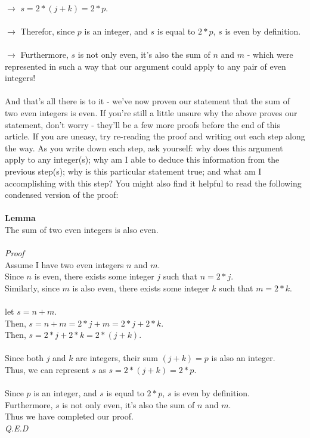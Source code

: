 \documentclass[a4paper,12pt]{article}
\begin{document}
\\
$\rightarrow$ $s = 2*(j + k) = 2*p$.\\ 
\\
$\rightarrow$ Therefor, since $p$ is an integer, and $s$ is equal to $2*p$, $s$ is even by definition.\\ 
\\
$\rightarrow$ Furthermore, $s$ is not only even, it's also the sum of $n$ and $m$ - which were represented in such a way that our argument could apply to any pair of even integers! \\
\\
And that's all there is to it - we've now proven our statement that the sum of two even integers is even. If you're still a little unsure why the above proves our statement, don't worry - they'll be a few more proofs before the end of this article. If you are uneasy, try re-reading the proof and writing out each step along the way. As you write down each step, ask yourself: why does this argument apply to any integer(s); why am I able to deduce this information from the previous step(s); why is this particular statement true; and what am I accomplishing with this step? You might also find it helpful to read the following condensed version of the proof:\\
\\
\textbf{Lemma}\\
The sum of two even integers is also even.\\
\\
\textit{Proof}\\
Assume I have two even integers $n$ and $m$. \\
Since $n$ is even, there exists some integer $j$ such that $n = 2*j$. \\
Similarly, since $m$ is also even, there exists some integer $k$ such that $m = 2*k$. \\
\\
let $s = n + m$.\\
Then, $s = n + m = 2*j + m = 2*j + 2*k$.\\
Then, $s = 2*j + 2*k = 2*(j + k)$. \\
\\
Since both $j$ and $k$ are integers, their sum $(j + k) = p$ is also an integer.\\
Thus, we can represent $s$ as $s = 2*(j + k) = 2*p$.\\ 
\\
Since $p$ is an integer, and $s$ is equal to $2*p$, $s$ is even by definition.\\ 
Furthermore, $s$ is not only even, it's also the sum of $n$ and $m$.\\
Thus we have completed our proof.\\
\textit{Q.E.D}
\end{document}
